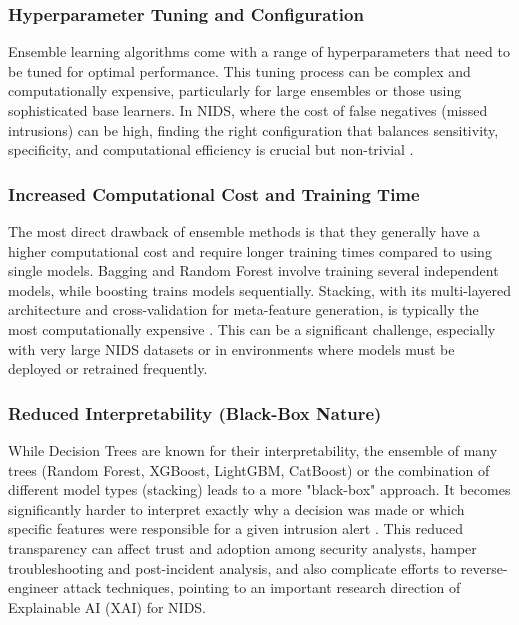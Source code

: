 \subsubsection{Hyperparameter Tuning and Configuration} 
Ensemble learning algorithms come with a range of hyperparameters that need to be tuned for optimal performance. This tuning process can be complex and computationally expensive, particularly for large ensembles or those using sophisticated base learners. In NIDS, where the cost of false negatives (missed intrusions) can be high, finding the right configuration that balances sensitivity, specificity, and computational efficiency is crucial but non-trivial \parencite{li2022challenges}.

\subsubsection{Increased Computational Cost and Training Time} 
The most direct drawback of ensemble methods is that they generally have a higher computational cost and require longer training times compared to using single models. Bagging and Random Forest involve training several independent models, while boosting trains models sequentially. Stacking, with its multi-layered architecture and cross-validation for meta-feature generation, is typically the most computationally expensive \parencite{aldhubaib2024network}. This can be a significant challenge, especially with very large NIDS datasets or in environments where models must be deployed or retrained frequently.

\subsubsection{Reduced Interpretability (Black-Box Nature)} 
While Decision Trees are known for their interpretability, the ensemble of many trees (Random Forest, XGBoost, LightGBM, CatBoost) or the combination of different model types (stacking) leads to a more "black-box" approach. It becomes significantly harder to interpret exactly why a decision was made or which specific features were responsible for a given intrusion alert \parencite{kasongo2021improving}. This reduced transparency can affect trust and adoption among security analysts, hamper troubleshooting and post-incident analysis, and also complicate efforts to reverse-engineer attack techniques, pointing to an important research direction of Explainable AI (XAI) for NIDS.

